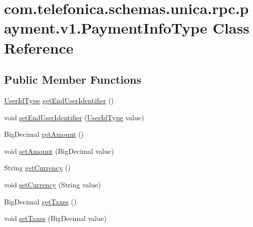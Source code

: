 \hypertarget{classcom_1_1telefonica_1_1schemas_1_1unica_1_1rpc_1_1payment_1_1v1_1_1PaymentInfoType}{
\section{com.telefonica.schemas.unica.rpc.payment.v1.PaymentInfoType Class Reference}
\label{classcom_1_1telefonica_1_1schemas_1_1unica_1_1rpc_1_1payment_1_1v1_1_1PaymentInfoType}
}
\subsection*{Public Member Functions}
\begin{DoxyCompactItemize}
\item 
\hyperlink{classcom_1_1telefonica_1_1schemas_1_1unica_1_1rpc_1_1common_1_1v1_1_1UserIdType}{UserIdType} \hyperlink{classcom_1_1telefonica_1_1schemas_1_1unica_1_1rpc_1_1payment_1_1v1_1_1PaymentInfoType_aadb91f0bd63991f20f055cc8748bf131}{getEndUserIdentifier} ()
\item 
void \hyperlink{classcom_1_1telefonica_1_1schemas_1_1unica_1_1rpc_1_1payment_1_1v1_1_1PaymentInfoType_a809cfc4538a28584007b094444d4d3fd}{setEndUserIdentifier} (\hyperlink{classcom_1_1telefonica_1_1schemas_1_1unica_1_1rpc_1_1common_1_1v1_1_1UserIdType}{UserIdType} value)
\item 
BigDecimal \hyperlink{classcom_1_1telefonica_1_1schemas_1_1unica_1_1rpc_1_1payment_1_1v1_1_1PaymentInfoType_aadafa877aeffe29802442c72eda7f2bd}{getAmount} ()
\item 
void \hyperlink{classcom_1_1telefonica_1_1schemas_1_1unica_1_1rpc_1_1payment_1_1v1_1_1PaymentInfoType_ab843bf40ca8ae372ec5ac1322f4262e7}{setAmount} (BigDecimal value)
\item 
String \hyperlink{classcom_1_1telefonica_1_1schemas_1_1unica_1_1rpc_1_1payment_1_1v1_1_1PaymentInfoType_ab2c6cb83fe665489e3c630ecafc1b774}{getCurrency} ()
\item 
void \hyperlink{classcom_1_1telefonica_1_1schemas_1_1unica_1_1rpc_1_1payment_1_1v1_1_1PaymentInfoType_a7ea05675b37528a0dc5513e259e3ab20}{setCurrency} (String value)
\item 
BigDecimal \hyperlink{classcom_1_1telefonica_1_1schemas_1_1unica_1_1rpc_1_1payment_1_1v1_1_1PaymentInfoType_a8fd02a4b59fd53559e6609095a4ee6c7}{getTaxes} ()
\item 
void \hyperlink{classcom_1_1telefonica_1_1schemas_1_1unica_1_1rpc_1_1payment_1_1v1_1_1PaymentInfoType_a81c63ed155d1ad16d6ba9c8cefa8004f}{setTaxes} (BigDecimal value)

\end{DoxyCompactItemize}
